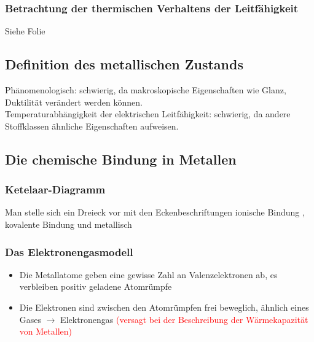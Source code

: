 \documentclass{article}
\begin{document}
\subsubsection{Betrachtung der thermischen Verhaltens der Leitfähigkeit}
Siehe Folie
\subsection{Definition des metallischen Zustands}
Phänomenologisch: schwierig, da makroskopische Eigenschaften wie Glanz, Duktilität verändert werden können.\\
Temperaturabhängigkeit der elektrischen Leitfähigkeit: schwierig, da andere Stoffklassen ähnliche Eigenschaften aufweisen.
\subsection{Die chemische Bindung in Metallen}
\subsubsection{Ketelaar-Diagramm}
Man stelle sich ein Dreieck vor mit den Eckenbeschriftungen ionische Bindung , kovalente Bindung  und metallisch 
\subsubsection{Das Elektronengasmodell}
\begin{itemize}
    \item Die Metallatome geben eine gewisse Zahl an Valenzelektronen ab, es verbleiben positiv geladene Atomrümpfe
    \item Die Elektronen sind zwischen den Atomrümpfen frei beweglich, ähnlich eines Gases $\rightarrow$ Elektronengas \textcolor{red}{(versagt bei der Beschreibung der Wärmekapazität von Metallen)}
\end{itemize}
\end{document}

